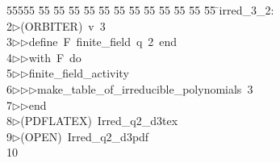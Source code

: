 %
%
\begin{tabbing}
55555 \= 55 \= 55 \= 55 \= 55 \= 55 \= 55 \= 55 \= 55 \= 55 \= 55 \= 55 \= 55 \= \>irred\_3\_2:\\[0pt]
2\>$\triangleright$\>(ORBITER)\ v\ 3\ \\[0pt]
3\>$\triangleright$\>$\triangleright$\>define\ F\ finite\_field\ q\ 2\ end\ \\[0pt]
4\>$\triangleright$\>$\triangleright$\>with\ F\ do\ \\[0pt]
5\>$\triangleright$\>$\triangleright$\>finite\_field\_activity\ \\[0pt]
6\>$\triangleright$\>$\triangleright$\>$\triangleright$\>make\_table\_of\_irreducible\_polynomials\ 3\ \\[0pt]
7\>$\triangleright$\>$\triangleright$\>end\\[0pt]
8\>$\triangleright$\>(PDFLATEX)\ Irred\_q2\_d3tex\\[0pt]
9\>$\triangleright$\>(OPEN)\ Irred\_q2\_d3pdf\\[0pt]
10\>\end{tabbing}
